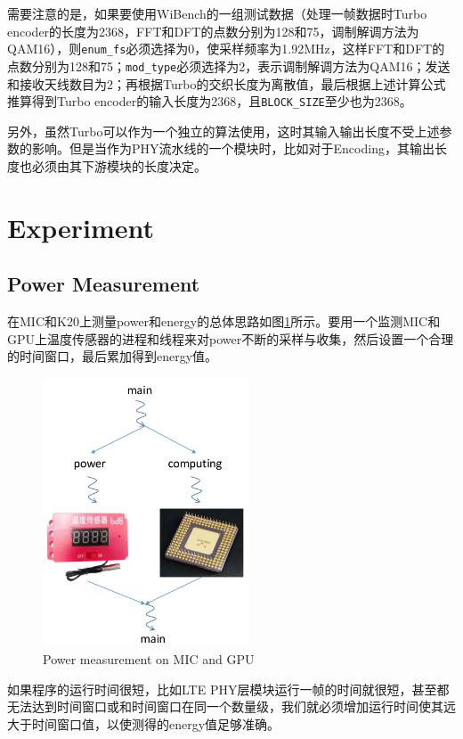 \documentclass[titlepage]{article}
\numberwithin{figure}{section}
\numberwithin{equation}{section}
\begin{document}
需要注意的是，如果要使用WiBench的一组测试数据（处理一帧数据时Turbo encoder的长度为2368，FFT和DFT的点数分别为128和75，调制解调方法为QAM16），则\verb|enum_fs|必须选择为0，使采样频率为1.92MHz，这样FFT和DFT的点数分别为128和75；\verb|mod_type|必须选择为2，表示调制解调方法为QAM16；发送和接收天线数目为2；再根据Turbo的交织长度为离散值，最后根据上述计算公式推算得到Turbo encoder的输入长度为2368，且\verb|BLOCK_SIZE|至少也为2368。

另外，虽然Turbo可以作为一个独立的算法使用，这时其输入输出长度不受上述参数的影响。但是当作为PHY流水线的一个模块时，比如对于Encoding，其输出长度也必须由其下游模块的长度决定。

\section{Experiment}

\subsection{Power Measurement}

在MIC和K20上测量power和energy的总体思路如图\ref{fig:micgpupower}所示。要用一个监测MIC和GPU上温度传感器的进程和线程来对power不断的采样与收集，然后设置一个合理的时间窗口，最后累加得到energy值。

\begin{figure}[htbp]\label{fig:micgpupower}
  \centering
  \includegraphics[height=3.14159in]{micgpupower}
  \caption{Power measurement on MIC and GPU}
\end{figure}

如果程序的运行时间很短，比如LTE PHY层模块运行一帧的时间就很短，甚至都无法达到时间窗口或和时间窗口在同一个数量级，我们就必须增加运行时间使其远大于时间窗口值，以使测得的energy值足够准确。
\end{document}

